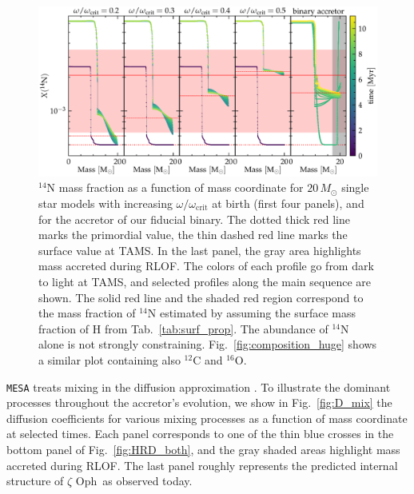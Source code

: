 \documentclass[twocolumn,twocolappendix,trackchanges]{aastex63}
\DeclareRobustCommand{\Figref}[1]{Fig.~\ref{#1}}
\DeclareRobustCommand{\Tabref}[1]{Tab.~\ref{#1}}
\newcommand{\zoph}{$\zeta$ Oph}
\begin{document}
\begin{figure}[htbp]
  \centering
  \includegraphics[width=\textwidth]{n14_struct_complete_zeta_ab}
  \caption{$^{14}\mathrm{N}$ mass fraction as a function of mass
    coordinate for $20\,M_\odot$ single star models with increasing
    $\omega/\omega_\mathrm{crit}$ at birth (first four panels), and
    for the accretor of our fiducial binary. The dotted thick red line
    marks the primordial value, the thin dashed red line marks the
    surface value at TAMS. In the last panel, the gray area highlights
    mass accreted during RLOF. The colors of each profile go from dark to
    light at TAMS, and selected profiles along the main sequence are
    shown. The solid red line and the shaded red region correspond to the
    mass fraction of $^{14}\mathrm{N}$ estimated by
     assuming the surface mass fraction of H
    from \Tabref{tab:surf_prop}. The abundance of $^{14}\mathrm{N}$
    alone is not strongly constraining. \Figref{fig:composition_huge}
    shows a similar plot containing also $^{12}\mathrm{C}$ and $^{16}\mathrm{O}$.}
  \label{fig:n14}
\end{figure}


\texttt{MESA} treats mixing in the diffusion approximation
\citep{paxton:11}.  To illustrate the dominant processes throughout
the accretor's evolution, we show in \Figref{fig:D_mix} the diffusion
coefficients for various mixing processes as a function of mass
coordinate at selected times. Each panel corresponds to one of the
thin blue crosses in the bottom panel of \Figref{fig:HRD_both}, and
the gray shaded areas highlight mass accreted during RLOF. The last
panel roughly represents the predicted internal structure of \zoph\ as
observed today.
\end{document}
